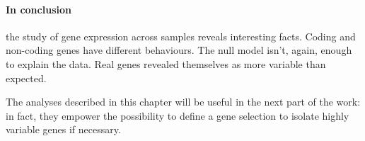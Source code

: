 \paragraph{In conclusion} the study of gene expression across samples reveals interesting facts. Coding and non-coding genes have different behaviours. The null model isn't, again, enough to explain the data. Real genes revealed themselves as more variable than expected.

The analyses described in this chapter will be useful in the next part of the work: in fact, they empower the possibility to define a gene selection to isolate highly variable genes if necessary.